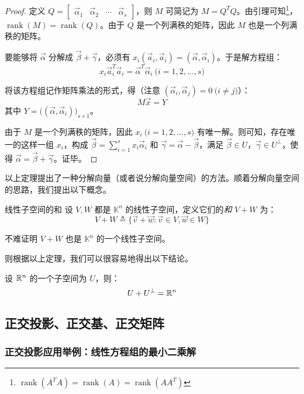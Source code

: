 \begin{proof}
	定义 $Q = \begin{bmatrix} \vec \alpha_1 & \vec \alpha_2 & \cdots & \vec \alpha_s \end{bmatrix}$，则 $M$ 可简记为 $M = Q^T Q$。由引理可知\footnote{$\operatorname{rank}(A^T A) = \operatorname{rank}(A) = \operatorname{rank}(AA^T)$}，$\operatorname{rank}(M) = \operatorname{rank}(Q)$。由于 $Q$ 是一个列满秩的矩阵，因此 $M$ 也是一个列满秩的矩阵。

	\bigskip

	要能够将 $\vec \alpha$ 分解成 $\vec \beta + \vec \gamma$，必须有 $x_i (\vec a_i, \vec a_i) = (\vec \alpha, \vec \alpha_i)$。于是解方程组：
	$$
	x_i \vec a_i^T \vec a_i = \vec \alpha^T \vec \alpha_i \pod{i = 1, 2, \ldots, s}
	$$

	将该方程组记作矩阵乘法的形式，得（注意 $(\vec \alpha_i, \vec \alpha_j) = 0 \pod{i \ne j}$）：
	$$
	M \vec x = Y
	$$
	其中 $Y = \bigl( (\vec \alpha, \vec \alpha_i) \bigr)_{s \times 1}$。

	由于 $M$ 是一个列满秩的矩阵，因此 $x_i \pod{i = 1, 2, \ldots, s}$ 有唯一解。则可知，存在唯一的这样一组 $x_i$，构成 $\vec \beta = \sum\limits_{i = 1}^s x_i \vec \alpha_i$ 和 $\vec \gamma = \vec \alpha - \vec \beta$，满足 $\vec \beta \in U$，$\vec \gamma \in U^\perp$，使得 $\vec \alpha = \vec \beta + \vec \gamma$。证毕。

\end{proof}

以上定理提出了一种分解向量（或者说分解向量空间）的方法。顺着分解向量空间的思路，我们提出以下概念。

\begin{definition}{线性子空间的和}
	设 $V, W$ 都是 $\mathbb K^n$ 的线性子空间，定义它们的\emph{和} $V + W$ 为：
	$$
	V + W \triangleq \{\vec v + \vec w \colon \vec v \in V, \vec w \in W\}
	$$

	不难证明 $V + W$ 也是 $\mathbb K^n$ 的一个线性子空间。
\end{definition}

则根据以上定理，我们可以很容易地得出以下结论。

\begin{theorem}
	设 $\mathbb R^n$ 的一个子空间为 $U$，则：
	$$
	U + U^\perp = \mathbb R^n
	$$
\end{theorem}

\subsection{正交投影、正交基、正交矩阵}

\subsubsection{正交投影应用举例：线性方程组的最小二乘解}

